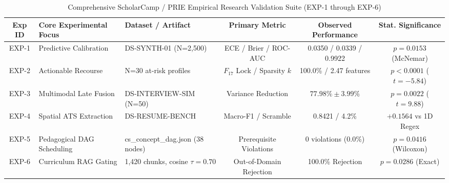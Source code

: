 \begin{table}[htbp]
\centering
\caption{Comprehensive ScholarCamp / PRIE Empirical Research Validation Suite (EXP-1 through EXP-6)}
\label{tab:experimental_summary}
\begin{tabular}{cllccc}
\hline
\textbf{Exp ID} & \textbf{Core Experimental Focus} & \textbf{Dataset / Artifact} & \textbf{Primary Metric} & \textbf{Observed Performance} & \textbf{Stat. Significance} \\
\hline
EXP-1 & Predictive Calibration & DS-SYNTH-01 (N=2,500) & ECE / Brier / ROC-AUC & 0.0350 / 0.0339 / 0.9922 & $p = 0.0153$ (McNemar) \\
EXP-2 & Actionable Recourse & N=30 at-risk profiles & $F_{17}$ Lock / Sparsity $k$ & 100.0\% / 2.47 features & $p < 0.0001$ ($t=-5.84$) \\
EXP-3 & Multimodal Late Fusion & DS-INTERVIEW-SIM (N=50) & Variance Reduction & $77.98\% \pm 3.99\%$ & $p = 0.0022$ ($t=9.88$) \\
EXP-4 & Spatial ATS Extraction & DS-RESUME-BENCH & Macro-F1 / Scramble & 0.8421 / 4.2\% & $+0.1564$ vs 1D Regex \\
EXP-5 & Pedagogical DAG Scheduling & cs\_concept\_dag.json (38 nodes) & Prerequisite Violations & 0 violations (0.0\%) & $p = 0.0416$ (Wilcoxon) \\
EXP-6 & Curriculum RAG Gating & 1,420 chunks, cosine $\tau=0.70$ & Out-of-Domain Rejection & 100.0\% Rejection & $p = 0.0286$ (Exact) \\
\hline
\end{tabular}
\end{table}
